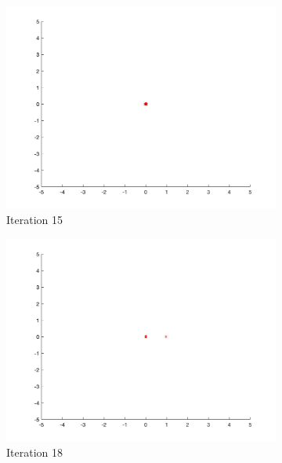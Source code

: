 \begin{figure}
\begin{subfigure}[b]{0.4\textwidth}
    \includegraphics[width=\textwidth]{img/smpl/circ/loa-iter-15}
    \caption{Iteration 15}
    \label{fig:s1-iter-4}
  \end{subfigure}
  \begin{subfigure}[b]{0.4\textwidth}
    \includegraphics[width=\textwidth]{img/smpl/circ/loa-iter-18}
    \caption{Iteration 18}
    \label{fig:s1-iter-5}
  \end{subfigure}
  \begin{subfigure}[b]{0.4\textwidth}

\end{subfigure}
\end{figure}
